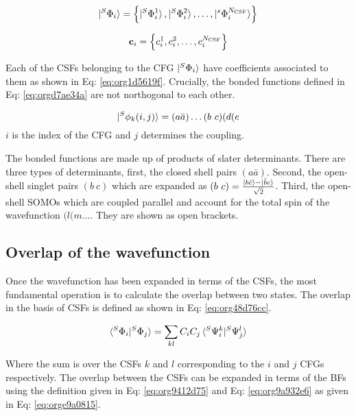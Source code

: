 \documentclass[11pt]{article}
\begin{document}
\begin{equation}
\label{eq:org9a932e6}
\ket{^S\Phi_i} = \left\{ \ket{^S\Phi^1_i}, \ket{^S\Phi^2_i}, \dots, \ket{^s\Phi^{N_{\text{CSF}}}_i} \right\}
\end{equation}



\begin{equation}
\label{eq:org1d5619f}
\mathbf{c}_i = \left\{ c^1_i, c^2_i, \dots, c^{N_{\text{CSF}}}_i \right\}
\end{equation}


Each of the CSFs belonging to the CFG \(\ket{^S\Phi_i}\) have coefficients
associated to them as shown in Eq: \ref{eq:org1d5619f}. Crucially, the bonded functions
defined in Eq: \ref{eq:orgd7ae34a} are not northogonal to each other.


\begin{equation}
\label{eq:orgd7ae34a}
\ket{^S\phi_k(i,j)} = (a\bar{a})\dots (b\ c) (d (e
\end{equation}
\(i\) is the index of the CFG and \(j\) determines the coupling.


The bonded functions are made up of products of slater determinants. There are
three types of determinants, first, the closed shell pairs \((a\bar{a})\). Second,
the open-shell singlet pairs \((b\ c)\) which are expanded as
\((b\ c) = \frac{\ket{b\bar{c}}-\ket{\bar{b}c}}{\sqrt{2}}\). Third, the
open-shell SOMOs which are coupled parallel and account for the total spin of the
wavefunction \((l (m \dots\). They are shown as open brackets.

\subsection{Overlap of the wavefunction}
\label{sec:orgf2a5d5d}

Once the wavefunction has been expanded in terms of the CSFs, the most fundamental
operation is to calculate the overlap between two states. The overlap in the
basis of CSFs is defined as shown in Eq: \ref{eq:org48d76cc}.


\begin{equation}
\label{eq:org48d76cc}
\braket{^S\Phi_i|^S\Phi_j} = \sum_{kl} C_i C_j \braket{^S\Psi^k_i|^S\Psi^l_j}
\end{equation}


Where the sum is over the CSFs \(k\) and \(l\) corresponding to the \(i\)
and \(j\) CFGs respectively. The overlap between the CSFs can be expanded in terms
of the BFs using the definition given in Eq: \ref{eq:org9412d75} and
Eq: \ref{eq:org9a932e6} as given in Eq: \ref{eq:orge9a0815}.
\end{document}
